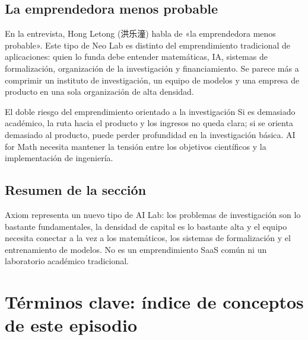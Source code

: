 \documentclass[a4paper]{article}
\begin{document}
\subsection{La emprendedora menos probable}

En la entrevista, Hong Letong (洪乐潼) habla de «la emprendedora menos probable». Este tipo de Neo Lab es distinto del emprendimiento tradicional de aplicaciones: quien lo funda debe entender matemáticas, IA, sistemas de formalización, organización de la investigación y financiamiento. Se parece más a comprimir un instituto de investigación, un equipo de modelos y una empresa de producto en una sola organización de alta densidad.

\begin{warningbox}{El doble riesgo del emprendimiento orientado a la investigación}
Si es demasiado académico, la ruta hacia el producto y los ingresos no queda clara; si se orienta demasiado al producto, puede perder profundidad en la investigación básica. AI for Math necesita mantener la tensión entre los objetivos científicos y la implementación de ingeniería.
\end{warningbox}

\subsection{Resumen de la sección}

Axiom representa un nuevo tipo de AI Lab: los problemas de investigación son lo bastante fundamentales, la densidad de capital es lo bastante alta y el equipo necesita conectar a la vez a los matemáticos, los sistemas de formalización y el entrenamiento de modelos. No es un emprendimiento SaaS común ni un laboratorio académico tradicional.
\section{Términos clave: índice de conceptos de este episodio}
\end{document}
